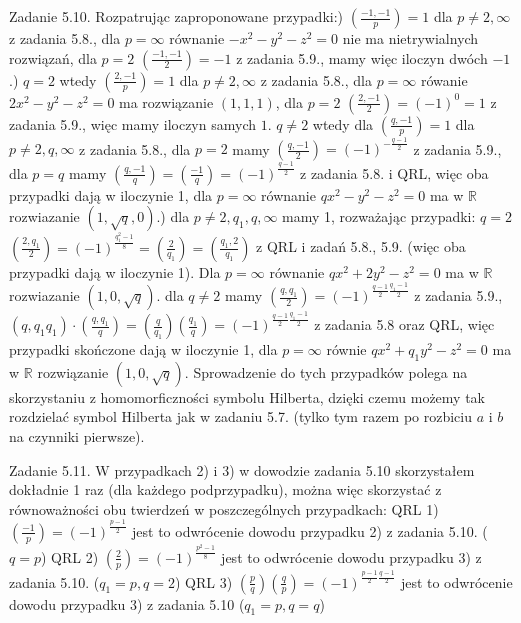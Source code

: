 \documentclass{article}
\begin{document}
Zadanie 5.10.
\newline
\newline
Rozpatrując zaproponowane przypadki:) $(\frac{-1,-1}{p})=1$ dla $p\neq 2,\infty$ z zadania 5.8., dla $p=\infty$ równanie $-x^2-y^2-z^2=0$ nie ma nietrywialnych rozwiązań, dla $p=2$ $(\frac{-1,-1}{2})=-1$ z zadania 5.9.,
mamy więc iloczyn dwóch $-1$.) $q=2$ wtedy $(\frac{2,-1}{p})=1$ dla $p\neq2,\infty$ z zadania 5.8., dla $p=\infty$ rówanie $2x^2-y^2-z^2=0$ ma rozwiązanie $(1,1,1)$, dla $p=2$ $(\frac{2,-1}{2})=(-1)^{0}=1$ z zadania 5.9.,
więc mamy iloczyn samych $1$.\newline
$q\neq2$ wtedy dla $(\frac{q,-1}{p})=1$ dla $p\neq2,q,\infty$ z zadania 5.8., dla $p=2$ mamy $(\frac{q,-1}{2})=(-1)^{-\frac{q-1}{2}}$ z zadania 5.9., 
dla $p=q$ mamy $(\frac{q,-1}{q})=(\frac{-1}{q})=(-1)^{\frac{q-1}{2}}$ z zadania 5.8. i QRL, więc oba przypadki dają w iloczynie 1, dla $p=\infty$ równanie $qx^2-y^2-z^2=0$
ma w $\mathbb{R}$ rozwiazanie $(1,\sqrt{q},0)$.) dla $p\neq 2,q_1,q,\infty$ mamy 1, rozważając przypadki:\newline
$q=2$ $(\frac{2,q_1}{2})=(-1)^{\frac{q_1^2-1}{8}}=(\frac{2}{q_1})=(\frac{q_1,2}{q_1})$ z QRL i zadań 5.8., 5.9. (więc oba przypadki dają w iloczynie 1). Dla $p=\infty$ równanie $qx^2+2y^2-z^2=0$
ma w $\mathbb{R}$ rozwiazanie $(1,0,\sqrt{q})$.\newline
dla $q\neq2$ mamy $(\frac{q,q_1}{2})=(-1)^{\frac{q-1}{2}\frac{q_1-1}{2}}$ z zadania 5.9.,
$({q,q_1}{q_1})\cdot(\frac{q,q_1}{q})=(\frac{q}{q_1})(\frac{q_1}{q})=(-1)^{\frac{q-1}{2}\frac{q_1-1}{2}}$ z zadania 5.8 oraz QRL, więc przypadki skończone dają w iloczynie 1,
dla $p=\infty$ równie $qx^2+q_1y^2-z^2=0$ ma w $\mathbb{R}$ rozwiązanie $(1,0,\sqrt{q})$.\newline
Sprowadzenie do tych przypadków polega na skorzystaniu z homomorficzności symbolu Hilberta, dzięki czemu możemy tak rozdzielać symbol Hilberta jak w zadaniu 5.7.
(tylko tym razem po rozbiciu $a$ i $b$ na czynniki pierwsze).\newline
\newline

Zadanie 5.11.
\newline
\newline
W przypadkach 2) i 3) w dowodzie zadania 5.10 skorzystałem dokładnie 1 raz (dla każdego podprzypadku), można więc skorzystać z równoważności obu twierdzeń w poszczególnych przypadkach:\newline
QRL 1) $(\frac{-1}{p})=(-1)^{\frac{p-1}{2}}$ jest to odwrócenie dowodu przypadku 2) z zadania 5.10. ($q=p$)\newline
QRL 2) $(\frac{2}{p})=(-1)^{\frac{p^2-1}{8}}$ jest to odwrócenie dowodu przypadku 3) z zadania 5.10. ($q_1=p,q=2$)\newline
QRL 3) $(\frac{p}{q})(\frac{q}{p})=(-1)^{\frac{p-1}{2}\frac{q-1}{2}}$ jest to odwrócenie dowodu przypadku 3) z zadania 5.10 ($q_1=p,q=q$)\newline
\end{document}
